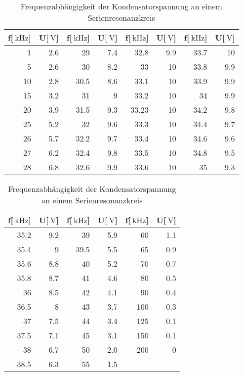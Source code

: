 \begin{table}
\begin{center}
\begin{tabular}{r|r|r|r|r|r|r|r}
f[$\SI{}{\kilo\hertz}$] & U[$\SI{}{\volt}$] & f[$\SI{}{\kilo\hertz}$] & U[$\SI{}{\volt}$] & f[$\SI{}{\kilo\hertz}$] & U[$\SI{}{\volt}$] & f[$\SI{}{\kilo\hertz}$] & U[$\SI{}{\volt}$] \\
\hline
1 & 2.6 & 29 & 7.4 & 32.8 & 9.9 & 33.7 & 10 \\
5 & 2.6 & 30 & 8.2 & 33 & 10 & 33.8 & 9.9 \\
10 & 2.8 & 30.5 & 8.6 & 33.1 & 10 & 33.9 & 9.9 \\
15 & 3.2 & 31 & 9 & 33.2 & 10 & 34 & 9.9 \\
20 & 3.9 & 31.5 & 9.3 & 33.23 & 10 & 34.2 & 9.8 \\
25 & 5.2 & 32 & 9.6 & 33.3 & 10 & 34.4 & 9.7 \\
26 & 5.7 & 32.2 & 9.7 & 33.4 & 10 & 34.6 & 9.6 \\
27 & 6.2 & 32.4 & 9.8 & 33.5 & 10 & 34.8 & 9.5 \\
28 & 6.8 & 32.6 & 9.9 & 33.6 & 10 & 35 & 9.3 \\
\end{tabular}
\end{center}
\newline
\begin{center}
\begin{tabular}{r|r|r|r|r|r}
f[$\SI{}{\kilo\hertz}$] & U[$\SI{}{\volt}$] & f[$\SI{}{\kilo\hertz}$] & U[$\SI{}{\volt}$] & f[$\SI{}{\kilo\hertz}$] & U[$\SI{}{\volt}$] \\
\hline
35.2 & 9.2 & 39 & 5.9 & 60 & 1.1 \\
35.4 & 9 & 39.5 & 5.5 & 65 & 0.9 \\
35.6 & 8.8 & 40 & 5.2 & 70 & 0.7 \\
35.8 & 8.7 & 41 & 4.6 & 80 & 0.5 \\
36 & 8.5 & 42 & 4.1 & 90 & 0.4 \\
36.5 & 8 & 43 & 3.7 & 100 & 0.3 \\
37 & 7.5 & 44 & 3.4 & 125 & 0.1 \\
37.5 & 7.1 & 45 & 3.1 & 150 & 0.1 \\
38 & 6.7 & 50 & 2.0 & 200 & 0 \\
38.5 & 6.3 & 55 & 1.5 \\
\end{tabular}
\caption[Messwerte zu Aufgabenteil c]{Frequenzabhängigkeit der Kondensatorspannung an einem Serienresonanzkreis}
\label{frequenz}
\end{center}
\end{table}
